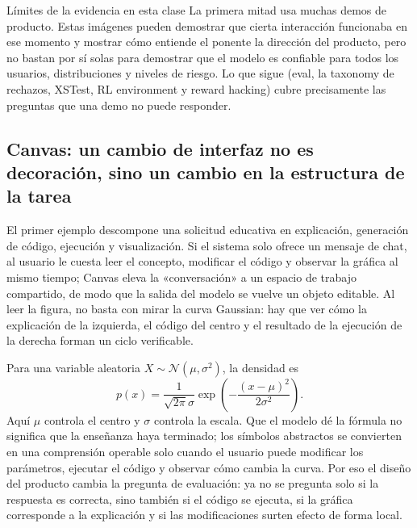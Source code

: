 \begin{knowledgebox}{Límites de la evidencia en esta clase}
La primera mitad usa muchas demos de producto. Estas imágenes pueden demostrar que cierta interacción funcionaba en ese momento y mostrar cómo entiende el ponente la dirección del producto, pero no bastan por sí solas para demostrar que el modelo es confiable para todos los usuarios, distribuciones y niveles de riesgo. Lo que sigue (eval, la taxonomy de rechazos, XSTest, RL environment y reward hacking) cubre precisamente las preguntas que una demo no puede responder.
\end{knowledgebox}

\subsection{Canvas: un cambio de interfaz no es decoración, sino un cambio en la estructura de la tarea}

El primer ejemplo descompone una solicitud educativa en explicación, generación de código, ejecución y visualización. Si el sistema solo ofrece un mensaje de chat, al usuario le cuesta leer el concepto, modificar el código y observar la gráfica al mismo tiempo; Canvas eleva la «conversación» a un espacio de trabajo compartido, de modo que la salida del modelo se vuelve un objeto editable. Al leer la figura, no basta con mirar la curva Gaussian: hay que ver cómo la explicación de la izquierda, el código del centro y el resultado de la ejecución de la derecha forman un ciclo verificable.


Para una variable aleatoria $X\sim\mathcal{N}(\mu,\sigma^2)$, la densidad es
\[
p(x)=\frac{1}{\sqrt{2\pi}\sigma}
\exp\!\left(-\frac{(x-\mu)^2}{2\sigma^2}\right).
\]
Aquí $\mu$ controla el centro y $\sigma$ controla la escala. Que el modelo dé la fórmula no significa que la enseñanza haya terminado; los símbolos abstractos se convierten en una comprensión operable solo cuando el usuario puede modificar los parámetros, ejecutar el código y observar cómo cambia la curva. Por eso el diseño del producto cambia la pregunta de evaluación: ya no se pregunta solo si la respuesta es correcta, sino también si el código se ejecuta, si la gráfica corresponde a la explicación y si las modificaciones surten efecto de forma local.

